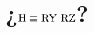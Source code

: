 \documentclass[a4paper]{plantillas/podxboq}
\title{¿$\gate{H}\equiv \gate{RY}\ \gate{RZ}$?}
\begin{document}
\begin{frontmatter}
\maketitle
\end{frontmatter}
%
%
%
%

\end{document}
